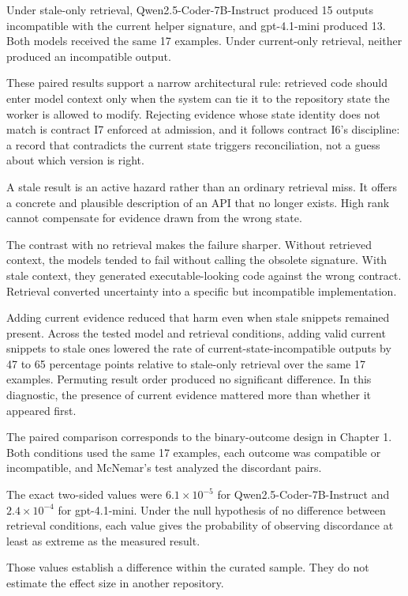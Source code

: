 Under stale-only retrieval, Qwen2.5-Coder-7B-Instruct produced 15 outputs incompatible with the current helper signature, and gpt-4.1-mini produced 13. Both models received the same 17 examples. Under current-only retrieval, neither produced an incompatible output.

These paired results support a narrow architectural rule: retrieved code should enter model context only when the system can tie it to the repository state the worker is allowed to modify. Rejecting evidence whose state identity does not match is contract I7 enforced at admission, and it follows contract I6's discipline: a record that contradicts the current state triggers reconciliation, not a guess about which version is right.

A stale result is an active hazard rather than an ordinary retrieval miss. It offers a concrete and plausible description of an API that no longer exists. High rank cannot compensate for evidence drawn from the wrong state.

The contrast with no retrieval makes the failure sharper. Without retrieved context, the models tended to fail without calling the obsolete signature. With stale context, they generated executable-looking code against the wrong contract. Retrieval converted uncertainty into a specific but incompatible implementation.

Adding current evidence reduced that harm even when stale snippets remained present. Across the tested model and retrieval conditions, adding valid current snippets to stale ones lowered the rate of current-state-incompatible outputs by 47 to 65 percentage points relative to stale-only retrieval over the same 17 examples. Permuting result order produced no significant difference. In this diagnostic, the presence of current evidence mattered more than whether it appeared first.

The paired comparison corresponds to the binary-outcome design in Chapter 1. Both conditions used the same 17 examples, each outcome was compatible or incompatible, and McNemar's test analyzed the discordant pairs.

The exact two-sided values were \(6.1 \times 10^{-5}\) for Qwen2.5-Coder-7B-Instruct and \(2.4 \times 10^{-4}\) for gpt-4.1-mini. Under the null hypothesis of no difference between retrieval conditions, each value gives the probability of observing discordance at least as extreme as the measured result.

Those values establish a difference within the curated sample. They do not estimate the effect size in another repository.

